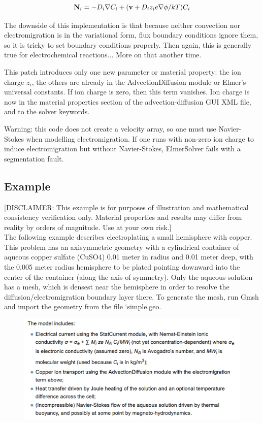 \begin{equation}
\bold N_i = -D_i \nabla C_i + (\bold v + D_i z_i e \nabla \phi/kT) C_i
\end{equation}

The downside of this implementation is that because neither convection nor electromigration is in the variational form, flux boundary conditions ignore them, so it is tricky to set boundary conditions properly. Then again, this is generally true for electrochemical reactions... More on that another time.

This patch introduces only one new parameter or material property: the ion charge $z_i$, the others are already in the AdvectionDiffusion module or Elmer's universal constants. If ion charge is zero, then this term vanishes. Ion charge is now in the material properties section of the advection-diffusion GUI XML file, and to the solver keywords.

Warning: this code does not create a velocity array, so one must use Navier-Stokes when modelling electromigration.  If one runs with non-zero ion charge to induce electromigration but without Navier-Stokes, ElmerSolver fails with a segmentation fault. 

\subsection{Example}

[DISCLAIMER: This example is for purposes of illustration and mathematical consistency verification only. Material properties and results may differ from reality by orders of magnitude. Use at your own risk.] \\

The following example describes electroplating a small hemisphere with copper. This problem has an axisymmetric geometry with a cylindrical container of aqueous copper sulfate (CuSO4) 0.01 meter in radius and 0.01 meter deep, with the 0.005 meter radius hemisphere to be plated pointing downward into the center of the container (along the axis of symmetry). Only the aqueous solution has a mesh, which is densest near the hemisphere in order to resolve the diffusion/electromigration boundary layer there. To generate the mesh, run Gmsh and import the geometry from the file `simple.geo. 

\begin{figure}[H]
\centering
\includegraphics[width=1.0\textwidth]{ec-22}
\end{figure}

